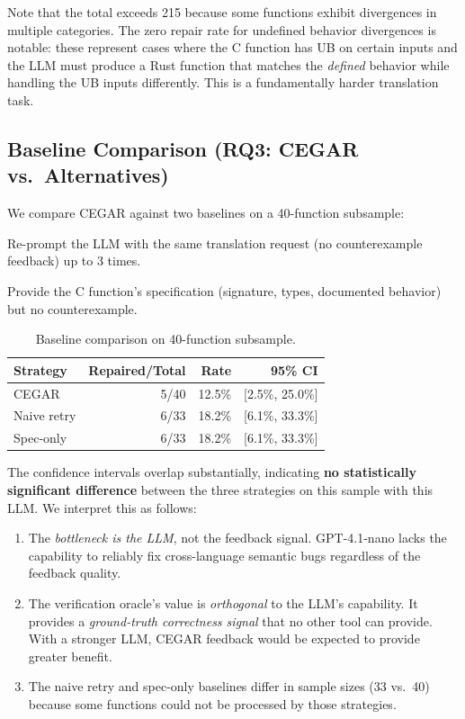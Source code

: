 \documentclass[10pt,letterpaper]{article}
\begin{document}
Note that the total exceeds 215 because some functions exhibit divergences in
multiple categories. The zero repair rate for undefined behavior divergences is
notable: these represent cases where the C function has UB on certain inputs and
the LLM must produce a Rust function that matches the \emph{defined} behavior
while handling the UB inputs differently. This is a fundamentally harder
translation task.

\subsection{Baseline Comparison (RQ3: CEGAR vs.\ Alternatives)}
\label{sec:baselines}

We compare CEGAR against two baselines on a 40-function subsample:

\begin{description}[itemsep=2pt]
\item[Naive retry:] Re-prompt the LLM with the same translation request
  (no counterexample feedback) up to 3 times.
\item[Spec-only:] Provide the C function's specification (signature, types,
  documented behavior) but no counterexample.
\end{description}

\begin{table}[t]
\centering
\caption{Baseline comparison on 40-function subsample.}
\label{tab:baselines}
\begin{tabular}{@{}lrrr@{}}
\toprule
\textbf{Strategy} & \textbf{Repaired/Total} & \textbf{Rate} & \textbf{95\% CI} \\
\midrule
CEGAR & 5/40 & 12.5\% & [2.5\%, 25.0\%] \\
Naive retry & 6/33 & 18.2\% & [6.1\%, 33.3\%] \\
Spec-only & 6/33 & 18.2\% & [6.1\%, 33.3\%] \\
\bottomrule
\end{tabular}
\end{table}

The confidence intervals overlap substantially, indicating \textbf{no statistically
significant difference} between the three strategies on this sample with this LLM.
We interpret this as follows:

\begin{enumerate}[itemsep=1pt]
\item The \emph{bottleneck is the LLM}, not the feedback signal. GPT-4.1-nano
  lacks the capability to reliably fix cross-language semantic bugs regardless of
  the feedback quality.
\item The verification oracle's value is \emph{orthogonal} to the LLM's capability.
  It provides a \emph{ground-truth correctness signal} that no other tool can provide.
  With a stronger LLM, CEGAR feedback would be expected to provide greater benefit.
\item The naive retry and spec-only baselines differ in sample sizes (33 vs.\ 40)
  because some functions could not be processed by those strategies.
\end{enumerate}
\end{document}
